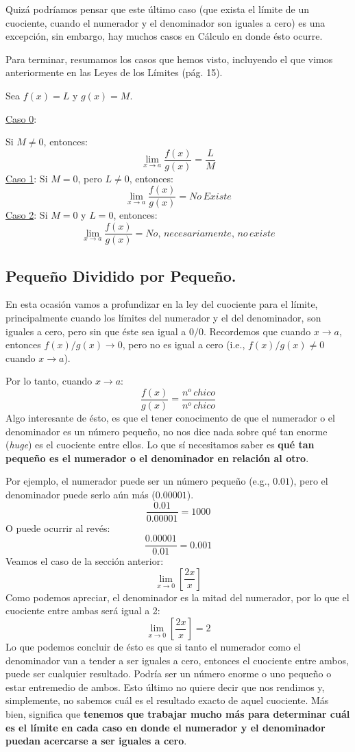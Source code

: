 \documentclass[12pt]{article}
\begin{document}
Quizá podríamos pensar que este último caso (que exista el límite de un cuociente, cuando el numerador y el denominador son iguales a cero) es una excepción, sin embargo, hay muchos casos en Cálculo en donde ésto ocurre.

Para terminar, resumamos los casos que hemos visto, incluyendo el que vimos anteriormente en las Leyes de los Límites (pág. 15).

Sea $f(x) = L$ y $g(x) = M$.

\underline{Caso 0}:

Si $M \neq 0$, entonces:
\[\lim_{x \to a} \frac{f(x)}{g(x)} = \frac{L}{M}\]
\underline{Caso 1}:
Si $M = 0$, pero $L \neq 0$, entonces:
\[\lim_{x \to a} \frac{f(x)}{g(x)} = No \, Existe\]
\underline{Caso 2}:
Si $M = 0$ y $L = 0$, entonces:
\[\lim_{x \to a} \frac{f(x)}{g(x)} = No, \, necesariamente, \, no \, existe\]


\subsection{Pequeño Dividido por Pequeño.}

En esta ocasión vamos a profundizar en la ley del cuociente para el límite, principalmente cuando los límites del numerador y el del denominador, son iguales a cero, pero sin que éste sea igual a $0/0$. Recordemos que cuando $x \to a$, entonces $f(x)/g(x) \to 0$, pero no es igual a cero (i.e., $f(x)/g(x) \neq 0$ cuando $x \to a$).

Por lo tanto, cuando $x \to a$:
\[\frac{f(x)}{g(x)} = \frac{n^{o} \, chico}{n^{o} \, chico}\]
Algo interesante de ésto, es que el tener conocimento de que el numerador o el denominador es un número pequeño, no nos dice nada sobre qué tan enorme (\textit{huge}) es el cuociente entre ellos. Lo que sí necesitamos saber es \textbf{qué tan pequeño es el numerador o el denominador en relación al otro}.

Por ejemplo, el numerador puede ser un número pequeño (e.g., $0.01$), pero el denominador puede serlo aún más ($0.00001$).
\[\frac{0.01}{0.00001} = 1000\]
O puede ocurrir al revés:
\[\frac{0.00001}{0.01} = 0.001\]
Veamos el caso de la sección anterior:
\[\lim_{x \to 0}\left[\frac{2x}{x}\right]\]
Como podemos apreciar, el denominador es la mitad del numerador, por lo que el cuociente entre ambas será igual a 2:
\[\lim_{x \to 0}\left[\frac{2x}{x}\right] = 2\]
Lo que podemos concluir de ésto es que si tanto el numerador como el denominador van a tender a ser iguales a cero, entonces el cuociente entre ambos, puede ser cualquier resultado. Podría ser un número enorme o uno pequeño o estar entremedio de ambos. Esto último no quiere decir que nos rendimos y, simplemente, no sabemos cuál es el resultado exacto de aquel cuociente. Más bien, significa que \textbf{tenemos que trabajar mucho más para determinar cuál es el límite en cada caso en donde el numerador y el denominador puedan acercarse a ser iguales a cero}.
\end{document}
